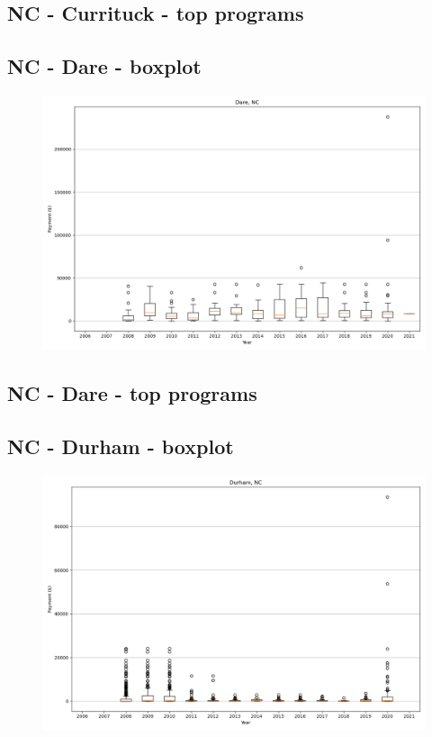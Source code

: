 \subsection*{NC - Currituck - top programs}

\newpage
\subsection*{NC - Dare - boxplot}
\begin{figure}[h]
\centering
\includegraphics[width=7in]{../output/boxplots/counties/Dare-NC_boxplot.png}
\end{figure}


\subsection*{NC - Dare - top programs}

\newpage
\subsection*{NC - Durham - boxplot}
\begin{figure}[h]
\centering
\includegraphics[width=7in]{../output/boxplots/counties/Durham-NC_boxplot.png}
\end{figure}


